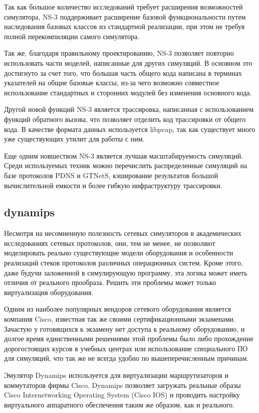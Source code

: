 Так как большое количество исследований требует расширения возможностей
симулятора, NS-3 поддерживает расширение базовой функциональности путем
наследования базовых классов из стандартной реализации, при этом не требуя 
полной перекомпиляции самого симулятора.

Так же, благодаря правильному проектированию, NS-3 позволяет повторно использовать
части моделей, написанные для других симуляций. В основном это достигнуто за счет
того, что большая часть общего кода написана в терминах указателей на общие базовые классы,
из-за чего возможно совместное использование стандартных и сторонних модулей без 
изменения основного кода.

Другой новой функций NS-3 является трассировка, написанная с использованием
функций обратного вызова, что позволяет отделить код трассировки от общего кода.
В качестве формата данных используется libpcap, так как существует много уже существующих
утилит для работы с ним.

Еще одним новшеством NS-3 является лучшая масштабируемость симуляций. Среди используемых
техник можно перечислить распределенные симуляций на базе протоколов PDNS и GTNetS,
кэширование результатов большой вычислительной емкости и более гибкую инфраструктуру
трассировки.

\subsection{dynamips}

Несмотря на несомненную полезность сетевых симуляторов в академических исследованиях
сетевых протоколов, они, тем не менее, не позволяют моделировать реально существующие
модели оборудования и особенности реализаций стеков протоколов различных операционных
систем. Кроме этого, даже будучи заложенной в симулирующую программу, эта логика
может иметь отличия от реального прообраза.
Решить эти проблемы может только виртуализация оборудования.

Одним из наиболее популярных вендоров сетевого оборудования является компания Cisco,
известная так же своими сертификационными экзаменами. Зачастую у готовящихся
к экзамену нет доступа к реальному оборудованию, и долгое время единственными решениями
этой проблемы было либо прохождение дорогостоящих курсов в учебных центрах или 
использование специального ПО для симуляций, что так же не всегда удобно по 
вышеперечисленным причинам.

Эмулятор Dynamips\cite{website:dynamips} используется для виртуализации маршрутизаторов и 
коммутаторов фирмы Cisco. 
Dynamips позволяет загружать реальные образы Cisco Internetworking Operating 
System (Cisco IOS) и проводить
настройку виртуального аппаратного обеспечения таким же образом, как и реального.
\cite{Zhang:2011:CCV:1975507.1976866}

